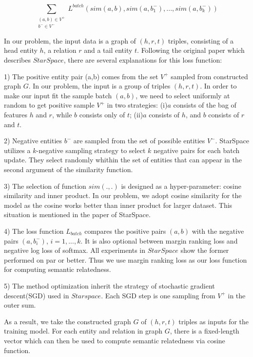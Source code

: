 \begin{small}
    \begin{equation}
        \nonumber
        \label{starspace_formula}
        \sum_{\substack{(a,b) \in V^+\\ b^- \in V^-}}L^{batch}(sim(a,b),sim(a,b_1^-),...,sim(a,b_k^-))
    \end{equation}
\end{small}
In our problem, the input data is a graph of $(h, r, t)$ triples, consisting of a head entity $h$, 
a relation $r$ and a tail entity $t$.
Following the original paper which describes $StarSpace$, there are several explanations for this loss function:

1) The positive entity pair (a,b) comes from the set $V^+$ sampled from constructed graph $G$. 
In our problem, the input is a group of triples $(h, r, t)$. In order to make our input fit
the sample batch $(a, b)$, we need to select uniformly at random to get positive sample $V^+$ in two strategies:
(i)$a$ consists of the bag of features $h$ and $r$, while $b$ consists only of $t$; 
(ii)$a$ consists of $h$, and $b$ consists of $r$ and $t$. 

2) Negative entities $b^-$ are sampled from the set of possible entities $V^-$.  
StarSpace utilizes a $k$-negative sampling strategy\cite{corr/Mikolov13} to select $k$ negative pairs for each batch update. 
They select randomly whithin the set of entities that can appear in the second argument of the similarity function.

3) The selection of function $sim(.,.)$ is designed as a hyper-parameter: cosine similarity and inner product.
In our problem, we adopt cosine similarity for the model as the cosine works better than inner product for
larger dataset. This situation is mentioned in the paper of StarSpace.

4) The loss function $L_{batch}$ compares the positive pairs $(a,b)$ with the negative pairs $(a, b_i^-)$, $i=1,...,k$.
It is also optional between margin ranking loss and negative log loss of softmax. All experiments in $StarSpace$ show
the former performed on par or better. Thus we use margin ranking loss as our loss function for computing semantic relatedness.

5) The method optimization inherit the strategy of stochastic gradient descent(SGD) used in $Starspace$. Each SGD step is one
sampling from $V^+$ in the outer sum.

As a result, we take the constructed graph $G$ of $(h, r, t)$ triples as inputs for the training model.
For each entity and relation in graph $G$, there is a fixed-length vector which can
then be used to compute semantic relatedness via cosine function.

